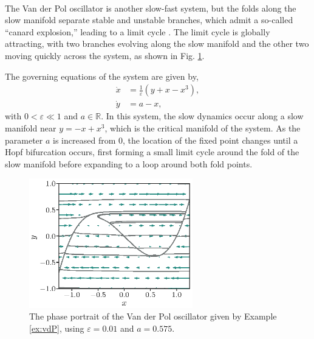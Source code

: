 \documentclass[twocolumn]{svjour3}
\begin{document}
 \\
The Van der Pol oscillator is another slow-fast system, but the folds along the slow manifold separate stable and unstable branches, which admit a so-called ``canard explosion,'' leading to a limit cycle \cite{krupa2001relaxation,kuehn2016multiple}. The limit cycle is globally attracting, with two branches evolving along the slow manifold and the other two moving quickly across the system, as shown in Fig. \ref{fig:phaseplot-vdP}.

The governing equations of the system are given by,
\begin{equation}
\begin{aligned}
\dot{x} & = \frac{1}{\varepsilon} \left(y + x - x^3\right), \\
\dot{y} & = a - x,
\end{aligned}
\label{eq: vanderPol}
\end{equation}
with $0<\varepsilon\ll1$ and $a\in\mathbb{R}$. In this system, the slow dynamics occur along a slow manifold near $y=-x+x^3$, which is the critical manifold of the system. As the parameter $a$ is increased from $0$, the location of the fixed point changes until a Hopf bifurcation occurs, first forming a small limit cycle around the fold of the slow manifold before expanding to a loop around both fold points.

\begin{figure}
\centering
\includegraphics[width=2.8in]{Figures/PhasePlot_vanderPol.eps}
\caption{The phase portrait of the Van der Pol oscillator given by Example \ref{ex:vdP}, using $\varepsilon = 0.01$ and $a = 0.575$.}
\label{fig:phaseplot-vdP}
\end{figure}
\end{document}
